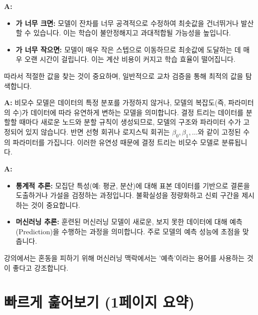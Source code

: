 \documentclass[11pt,a4paper]{article}
\theoremstyle{definition}
\begin{document}
\begin{faqbox}[title=\textbf{Q: 학습률(\texttt{\lambda})이 너무 크거나 작으면 모델 학습에 어떤 문제가 발생하나요?}] %
\textbf{A:}
\begin{itemize}
    \item \textbf{\texttt{\lambda}가 너무 크면:} 모델이 잔차를 너무 공격적으로 수정하여 최솟값을 건너뛰거나 발산할 수 있습니다. 이는 학습이 불안정해지고 과대적합될 가능성을 높입니다.
    \item \textbf{\texttt{\lambda}가 너무 작으면:} 모델이 매우 작은 스텝으로 이동하므로 최솟값에 도달하는 데 매우 오랜 시간이 걸립니다. 이는 계산 비용이 커지고 학습 효율이 떨어집니다.
\end{itemize}
따라서 적절한 \texttt{\lambda} 값을 찾는 것이 중요하며, 일반적으로 교차 검증을 통해 최적의 값을 탐색합니다.
\end{faqbox}

\begin{faqbox}[title=\textbf{Q: 결정 트리가 왜 비모수 모델(Non-parametric Model)인가요?}] %
\textbf{A:} 비모수 모델은 데이터의 특정 분포를 가정하지 않거나, 모델의 복잡도(즉, 파라미터의 수)가 데이터에 따라 유연하게 변하는 모델을 의미합니다. 결정 트리는 데이터를 분할할 때마다 새로운 노드와 분할 규칙이 생성되므로, 모델의 구조와 파라미터 수가 고정되어 있지 않습니다. 반면 선형 회귀나 로지스틱 회귀는 $\beta_0, \beta_1, \dots$와 같이 고정된 수의 파라미터를 가집니다. 이러한 유연성 때문에 결정 트리는 비모수 모델로 분류됩니다.
\end{faqbox}

\begin{faqbox}[title=\textbf{Q: 머신러닝에서 '추론(Inference)'이라는 용어는 통계적 추론과 어떻게 다른가요?}] %
\textbf{A:}
\begin{itemize}
    \item \textbf{통계적 추론:} 모집단 특성(예: 평균, 분산)에 대해 표본 데이터를 기반으로 결론을 도출하거나 가설을 검정하는 과정입니다. 불확실성을 정량화하고 신뢰 구간을 제시하는 것이 중요합니다.
    \item \textbf{머신러닝 추론:} 훈련된 머신러닝 모델이 새로운, 보지 못한 데이터에 대해 예측(Prediction)을 수행하는 과정을 의미합니다. 주로 모델의 예측 성능에 초점을 맞춥니다.
\end{itemize}
강의에서는 혼동을 피하기 위해 머신러닝 맥락에서는 '예측'이라는 용어를 사용하는 것이 좋다고 강조합니다.
\end{faqbox}

\newpage
\section{빠르게 훑어보기 (1페이지 요약)}
\end{document}
